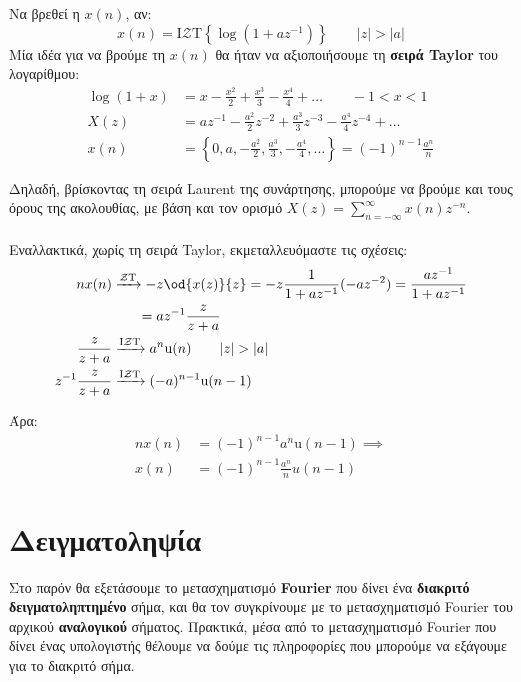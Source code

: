\documentclass[11pt,a4paper,notitlepage,fleqn]{article}
\begin{document}
\begin{exercise}
	Να βρεθεί η \( x(n) \), αν:
	\[
	x(n) = \text{I}\mathcal{Z}\text{T} \left\lbrace 
	\log \left(1+az^{-1}\right)
	 \right\rbrace \qquad |z|>|a|
	\]
	\tcblower
	Μία ιδέα για να βρούμε τη \( x(n) \) θα ήταν να αξιοποιήσουμε τη \textbf{σειρά Taylor} του λογαρίθμου:
	\begin{align*}
		\log(1+x) &= x-\frac{x^2}{2} + \frac{x^3}{3} - \frac{x^4}{4} + \dots \qquad -1<x<1\\
		X(z) &= az^{-1} - \frac{a^2}{2}z^{-2} + \frac{a^3}{3}z^{-3} - \frac{a^4}{4} z^{-4} + \dots \\
		x(n) &= \left\lbrace 
		0, a , -\frac{a^2}{2}, \frac{a^3}{3},-\frac{a^4}{4},\dots
		 \right\rbrace = (-1)^{n-1}\frac{a^n}{n}
	\end{align*}
	
	Δηλαδή, βρίσκοντας τη σειρά Laurent της συνάρτησης, μπορούμε να βρούμε και τους όρους της ακολουθίας,
	με βάση και τον ορισμό \( X(z) = \sum_{n=-\infty}^{\infty} x(n)z^{-n}. \)
	
	\paragraph{}
	Εναλλακτικά, χωρίς τη σειρά Taylor, εκμεταλλευόμαστε τις σχέσεις:
	\begin{align*}
		nx(n) &\xrightarrow{\mathcal{Z}\text{T}} -z\od{x(z)}{z}
		= -z\frac{1}{1+az^{-1}}(-az^{-2})=\frac{az^{-1}}{1+az^{-1}}
		\\ &\hphantom{\xrightarrow{\mathcal{Z}\text{T}}} = az^{-1} \frac{z}{z+a}
        \\
        \frac{z}{z+a} &\xrightarrow{\text{I}\mathcal{Z}\text{T}} a^n \mathrm{u}(n) \qquad |z|>|a|\\
        z^{-1}\frac{z}{z+a} &\xrightarrow{\text{I}\mathcal{Z}\text{T}}
        (-a)^{n-1}\mathrm{u}(n-1)
	\end{align*}
	
	Άρα: \begin{align*}
	nx(n) &= (-1)^{n-1}a^n\mathrm{u}(n-1)
	\implies \\ x(n) &= (-1)^{n-1}\frac{a^n}{n} u(n-1)
	\end{align*}
\end{exercise}


\section{Δειγματοληψία}
Στο παρόν θα εξετάσουμε το μετασχηματισμό \textbf{Fourier} που δίνει ένα
\textbf{διακριτό δειγματοληπτημένο} σήμα, και θα τον συγκρίνουμε με το
μετασχηματισμό Fourier του αρχικού \textbf{αναλογικού} σήματος.
Πρακτικά, μέσα από το μετασχηματισμό Fourier που δίνει ένας υπολογιστής
θέλουμε να δούμε τις πληροφορίες που μπορούμε να εξάγουμε για το διακριτό
σήμα.
\end{document}
